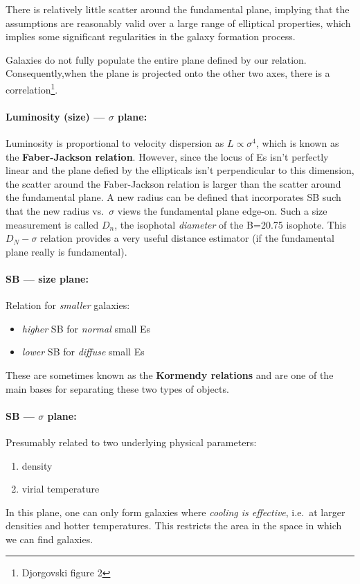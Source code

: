 \documentclass{article}
\begin{document}
There is relatively little scatter around the fundamental plane, implying that
the assumptions are reasonably valid over a large range of elliptical
properties, which implies some significant regularities in the galaxy formation
process.

Galaxies do not fully populate the entire plane defined by our relation.
Consequently,when the plane is projected onto the other two axes, there is a
correlation\footnote{Djorgovski figure 2}.

\paragraph{Luminosity (size) --- $\sigma$ plane:}
Luminosity is proportional to velocity dispersion as
$L\propto\sigma^{4}$, which is known as the \textbf{Faber-Jackson relation}.
However, since the locus of Es isn't perfectly linear and the plane defied by
the ellipticals isn't perpendicular to this dimension, the scatter around the
Faber-Jackson relation is larger than the scatter around the fundamental plane.
A new radius can be defined that incorporates SB such that the new radius vs.\
$\sigma$ views the fundamental plane edge-on. Such a size measurement is called
$D_{n}$, the isophotal \emph{diameter} of the B=20.75 isophote. This
$D_{N}-\sigma$ relation provides a very useful distance estimator (if the
fundamental plane really is fundamental).

\paragraph{SB --- size plane:}
Relation for \emph{smaller} galaxies:
\begin{itemize}
    \item \emph{higher} SB for \emph{normal} small Es
    \item \emph{lower} SB for \emph{diffuse} small Es
\end{itemize}
These are sometimes known as the \textbf{Kormendy relations} and are one of the
main bases for separating these two types of objects.

\paragraph{SB --- $\sigma$ plane:} Presumably related to
two underlying physical parameters:
\begin{enumerate}
    \item density
    \item virial temperature
\end{enumerate}
In this plane, one can only form galaxies where \emph{cooling is effective},
i.e.\ at larger densities and hotter temperatures. This restricts
the area in the space in which we can find galaxies.
\end{document}
